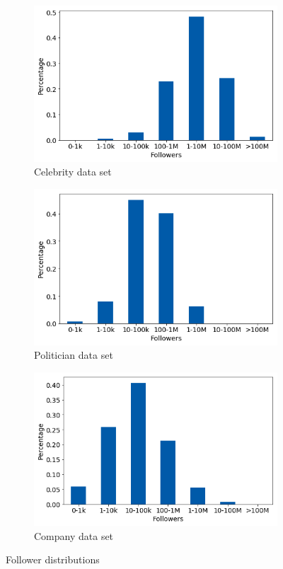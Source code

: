 \begin{figure}[h]
\begin{subfigure}{.33\textwidth}
  \includegraphics[width=.95\linewidth]{img/celeb_follow_distr}
  \caption{Celebrity data set}
  \label{fig:follow_distr_sub1}
\end{subfigure}%
\begin{subfigure}{.33\textwidth}
  \includegraphics[width=.95\linewidth]{img/polit_follow_distr}
  \caption{Politician data set}
  \label{fig:follow_distr_sub2}
\end{subfigure}
\begin{subfigure}{.33\textwidth}
  \includegraphics[width=.95\linewidth]{img/corp_follow_distr}
  \caption{Company data set}
  \label{fig:follow_distr_sub3}
\end{subfigure}%
\caption{Follower distributions}
\label{fig:follow_distr}
\end{figure}

